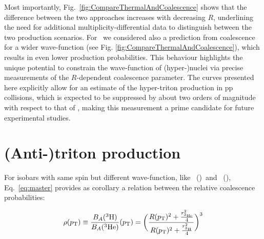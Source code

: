 \documentclass[%
 reprint,
 amsmath,amssymb,
 aps,
]{revtex4-1}
\begin{document}
Most importantly, Fig.~\ref{fig:CompareThermalAndCoalescence} shows that the difference between the two approaches increases with decreasing $R$, underlining the need for additional multiplicity-differential data to distinguish between the two production scenarios. 
For \hthreelambda~we considered also a prediction from coalescence for a wider wave-function (see Fig. \ref{fig:CompareThermalAndCoalescence}), which results in even lower production probabilities. This behaviour highlights the unique potential to constrain the wave-function of (hyper-)nuclei via precise measurements of the $R$-dependent coalescence parameter. 
The curves presented here explicitly allow for an estimate of the hyper-triton production in pp collisions, which is expected to be suppressed by about two orders of magnitude with respect to that of \hethree, making this measurement a prime candidate for future experimental studies.

\section{(Anti-)triton production}
For isobars with same spin but different wave-function, like \tritium~(\antitritium)~and \hethree~(\antihethree), Eq.~\ref{eq:master} provides as corollary a relation between the relative coalescence probabilities:

\begin{equation} \label{eq:rho}
\rho (p_{\mathrm{T}}) \equiv \frac{B_{A}({}^{3}\mathrm{H})}{B_{A}({}^{3}\mathrm{He})}(p_{\mathrm{T}}) = \bigg( \frac{R(p_{\mathrm{T}})^{2} + \frac{r_{{}^{3}\mathrm{He}}^{2}}{4}} {R(p_{\mathrm{T}})^{2} + \frac{r_{{}^{3}\mathrm{H}}^{2}}{4}} \bigg)^{3}
\end{equation}
\end{document}
